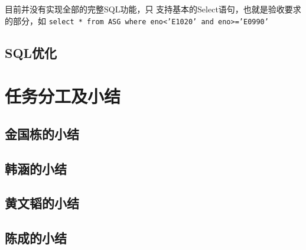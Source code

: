 \documentclass[a4paper, 12pt]{ctexart}
\begin{document}
目前并没有实现全部的完整SQL功能，只
支持基本的Select语句，也就是验收要求的部分，如
\lstinline|select * from ASG where eno<’E1020’ and eno>=’E0990’| 





\subsection{SQL优化}

\section{任务分工及小结}

\subsection{金国栋的小结}

\subsection{韩涵的小结}

\subsection{黄文韬的小结}

\subsection{陈成的小结}





 
\end{document}
